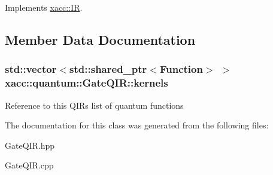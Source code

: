 Implements \hyperlink{a00167_a8356cdff1919b88eabeb84fd7450cdb6}{xacc\+::\+IR}.



\subsection{Member Data Documentation}
\subsubsection[{\texorpdfstring{kernels}{kernels}}]{\setlength{\rightskip}{0pt plus 5cm}std\+::vector$<$std\+::shared\+\_\+ptr$<${\bf Function}$>$ $>$ xacc\+::quantum\+::\+Gate\+Q\+I\+R\+::kernels\hspace{0.3cm}{\ttfamily [protected]}}\hypertarget{a00113_ae75a4af0ce455eee1ce316c16426a661}{}\label{a00113_ae75a4af0ce455eee1ce316c16426a661}
Reference to this Q\+IR\textquotesingle{}s list of quantum functions 

The documentation for this class was generated from the following files\+:\begin{DoxyCompactItemize}
\item 
Gate\+Q\+I\+R.\+hpp\item 
Gate\+Q\+I\+R.\+cpp\end{DoxyCompactItemize}
